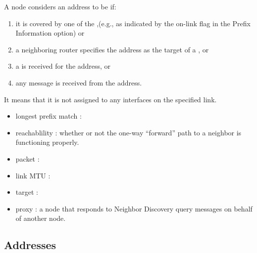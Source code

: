 \documentclass[dvipsnames]{article}
\begin{document}
\begin{itemize}
{    A node considers an address to be  if:

    \begin{enumerate}
    \item it is covered by one of the ,(e.g., as indicated
      by the on-link flag in the Prefix Information option) or
    \item a neighboring router specifies the address as the target of a , or
    \item a  is received for the address, or
    \item any  message is received from the address.
    \end{enumerate}

     It means
    that it is not assigned to any interfaces on the specified link.
  }
\end{itemize}



\begin{itemize}
\item longest prefix match : 
\item reachablility : whether or not the one-way ``forward'' path to a neighbor
  is functioning properly. 
\item packet : 
\item link MTU : 
\item target : 
\item proxy : a node that responds to Neighbor Discovery query messages on
  behalf of another node. 
\end{itemize}

\subsection{Addresses}
\end{document}
